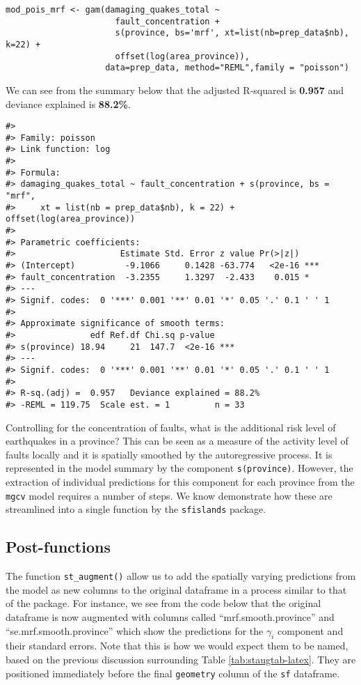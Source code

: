 \begin{verbatim}
mod_pois_mrf <- gam(damaging_quakes_total ~ 
                      fault_concentration +
                      s(province, bs='mrf', xt=list(nb=prep_data$nb), k=22) +
                      offset(log(area_province)),
                    data=prep_data, method="REML",family = "poisson")
\end{verbatim}

We can see from the summary below that the adjusted R-squared is \textbf{0.957} and deviance explained is \textbf{88.2\%}.

\begin{verbatim}
#> 
#> Family: poisson 
#> Link function: log 
#> 
#> Formula:
#> damaging_quakes_total ~ fault_concentration + s(province, bs = "mrf", 
#>     xt = list(nb = prep_data$nb), k = 22) + offset(log(area_province))
#> 
#> Parametric coefficients:
#>                     Estimate Std. Error z value Pr(>|z|)    
#> (Intercept)          -9.1066     0.1428 -63.774   <2e-16 ***
#> fault_concentration  -3.2355     1.3297  -2.433    0.015 *  
#> ---
#> Signif. codes:  0 '***' 0.001 '**' 0.01 '*' 0.05 '.' 0.1 ' ' 1
#> 
#> Approximate significance of smooth terms:
#>               edf Ref.df Chi.sq p-value    
#> s(province) 18.94     21  147.7  <2e-16 ***
#> ---
#> Signif. codes:  0 '***' 0.001 '**' 0.01 '*' 0.05 '.' 0.1 ' ' 1
#> 
#> R-sq.(adj) =  0.957   Deviance explained = 88.2%
#> -REML = 119.75  Scale est. = 1         n = 33
\end{verbatim}

Controlling for the concentration of faults, what is the additional risk level of
earthquakes in a province? This can be seen as a measure of the activity
level of faults locally and it is spatially smoothed by the
autoregressive process. It is represented in the model summary by the component \texttt{s(province)}. However, the extraction of individual predictions for this component for each province from the \texttt{mgcv} model requires a number of steps. We know demonstrate how these are streamlined into a single function by the \texttt{sfislands} package.

\hypertarget{post-functions-1}{%
\subsection{Post-functions}\label{post-functions-1}}

The function \texttt{st\_augment()} allow us to add the spatially varying predictions from the model as new columns to the original dataframe in a process
similar to that of the  package. For instance, we see from the code below that the original dataframe is now augmented with columns called ``mrf.smooth.province'' and ``se.mrf.smooth.province'' which show the predictions for the \(\gamma_i\) component and their standard errors. Note that this is how we would expect them to be named, based on the previous discussion surrounding Table \ref{tab:staugtab-latex}. They are positioned immediately before the final \texttt{geometry} column of the \texttt{sf} dataframe.

